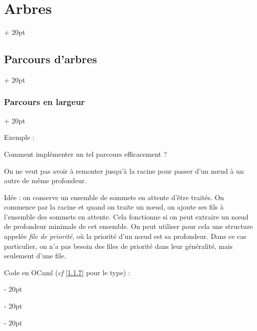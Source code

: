 \documentclass[a4paper, 12pt, twoside]{article}
\newcommand{\ind}[1][20pt]{\advance\leftskip + #1}
\newcommand{\deind}[1][20pt]{\advance\leftskip - #1}
\newenvironment{indt}[2][20pt]{#2 \par \ind[#1]}{\par \deind} %
\begin{document}
\begin{indt}{\section{Arbres}}
\begin{indt}{\subsection{Parcours d'arbres}}
\begin{indt}{\subsubsection{Parcours en largeur}}
                \vspace{6pt}
                
                Exemple :
                
                \begin{center}
                \end{center}
                \vspace{6pt}
                
                Comment implémenter un tel parcours efficacement ?
                
                On ne veut pas avoir à remonter jusqu'à la racine pour passer d'un n\oe ud à un autre de même profondeur.
                
                \vspace{6pt}
                
                Idée : on conserve un ensemble de sommets en attente d'être traités. On commence par la racine et quand on traite un n\oe ud, on ajoute ses fils à l'ensemble des sommets en attente. Cela fonctionne si on peut extraire un n\oe ud de profondeur minimale de cet ensemble. On peut utiliser pour cela une structure appelée \textit{file de priorité}, où la priorité d'un n\oe ud est sa profondeur. Dans ce cas particulier, on n'a pas besoin des files de priorité dans leur généralité, mais seulement d'une file.
                
                \vspace{6pt}
                
                Code en OCaml (\textit{cf} \ref{1.1.7} pour le type) :
                

\end{indt}
\end{indt}
\end{indt}
\end{document}
